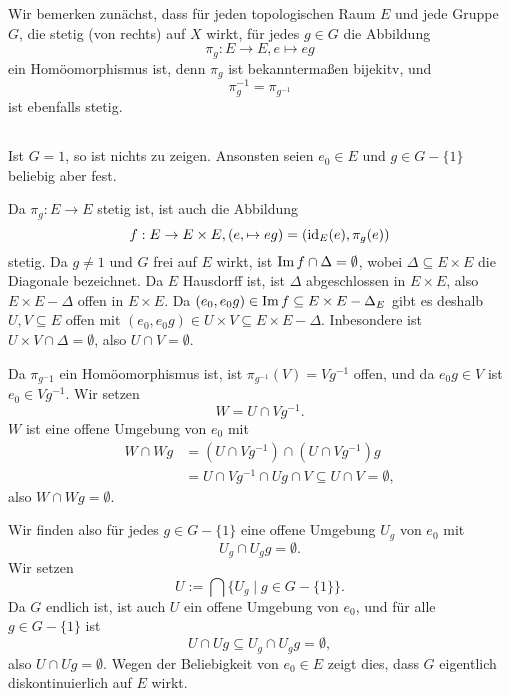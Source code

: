 \documentclass[a4paper,10pt]{article}
\begin{document}
\section{}
Wir bemerken zunächst, dass für jeden topologischen Raum $E$ und jede Gruppe $G$, die stetig (von rechts) auf $X$ wirkt, für jedes $g \in G$ die Abbildung
\[
 \pi_g : E \to E, e \mapsto eg
\]
ein Homöomorphismus ist, denn $\pi_g$ ist bekanntermaßen bijekitv, und
\[
 \pi_g^{-1} = \pi_{g^{-1}}
\]
ist ebenfalls stetig.


\subsection{}
Ist $G = 1$, so ist nichts zu zeigen. Ansonsten seien $e_0 \in E$ und $g \in G-\{1\}$ beliebig aber fest.

Da $\pi_g : E \to E$ stetig ist, ist auch die Abbildung
\[
 f : E \to E \times E, (e, \mapsto eg) = (\operatorname{id}_E(e), \pi_g(e))
\]
stetig. Da $g \neq 1$ und $G$ frei auf $E$ wirkt, ist $\operatorname{Im} f \cap \Delta = \emptyset$, wobei $\Delta \subseteq E \times E$ die Diagonale bezeichnet. Da $E$ Hausdorff ist, ist $\Delta$ abgeschlossen in $E \times E$, also $E \times E - \Delta$ offen in $E \times E$. Da $(e_0, e_0 g) \in \operatorname{Im} f \subseteq E \times E - \Delta_E$ gibt es deshalb $U, V \subseteq E$ offen mit $(e_0, e_0g) \in U \times V \subseteq E \times E - \Delta$. Inbesondere ist $U \times V \cap \Delta = \emptyset$, also $U \cap V = \emptyset$.

Da $\pi_{g^-1}$ ein Homöomorphismus ist, ist $\pi_{g^{-1}}(V) = Vg^{-1}$ offen, und da $e_0 g \in V$ ist $e_0 \in Vg^{-1}$. Wir setzen
\[
 W = U \cap Vg^{-1}.
\]
$W$ ist eine offene Umgebung von $e_0$ mit
\begin{align*}
 W \cap Wg
 &= \left( U \cap Vg^{-1} \right) \cap \left( U \cap Vg^{-1} \right)g \\
 &= U \cap Vg^{-1} \cap Ug \cap V
 \subseteq U \cap V
 = \emptyset,
\end{align*}
also $W \cap Wg = \emptyset$.

Wir finden also für jedes $g \in G-\{1\}$ eine offene Umgebung $U_g$ von $e_0$ mit
\[
 U_g \cap U_g g = \emptyset.
\]
Wir setzen
\[
 U := \bigcap \{U_g \mid g \in G-\{1\}\}.
\]
Da $G$ endlich ist, ist auch $U$ ein offene Umgebung von $e_0$, und für alle $g \in G-\{1\}$ ist
\[
 U \cap Ug
 \subseteq U_g \cap U_g g
 = \emptyset,
\]
also $U \cap Ug = \emptyset$. Wegen der Beliebigkeit von $e_0 \in E$ zeigt dies, dass $G$ eigentlich diskontinuierlich auf $E$ wirkt.
\end{document}
